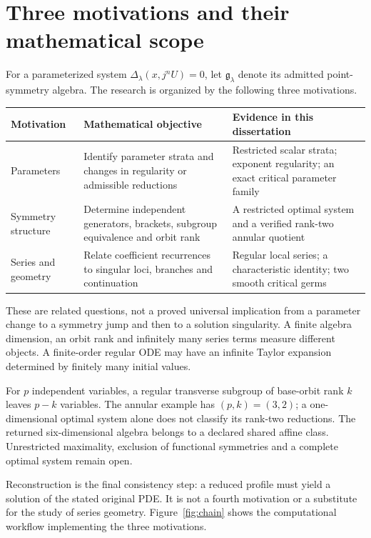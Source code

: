 \documentclass[12pt,a4paper,oneside]{report}
\numberwithin{equation}{chapter}
\theoremstyle{remark}\newtheorem{remark}[theorem]{Remark}
\begin{document}
\section{Three motivations and their mathematical scope}
For a parameterized system $\Delta_\lambda(x,j^nU)=0$, let
$\mathfrak g_\lambda$ denote its admitted point-symmetry algebra. The research
is organized by the following three motivations.
\begin{center}\small
\begin{tabularx}{\textwidth}{@{}p{}XX@{}}\toprule
Motivation & Mathematical objective & Evidence in this dissertation\\\midrule
Parameters & Identify parameter strata and changes in regularity or admissible reductions & Restricted scalar strata; exponent regularity; an exact critical parameter family\\
Symmetry structure & Determine independent generators, brackets, subgroup equivalence and orbit rank & A restricted optimal system and a verified rank-two annular quotient\\
Series and geometry & Relate coefficient recurrences to singular loci, branches and continuation & Regular local series; a characteristic identity; two smooth critical germs\\\bottomrule
\end{tabularx}
\end{center}
These are related questions, not a proved universal implication from a
parameter change to a symmetry jump and then to a solution singularity.
A finite algebra dimension, an orbit rank and infinitely many series terms
measure different objects. A finite-order regular ODE may have an infinite
Taylor expansion determined by finitely many initial values.

For $p$ independent variables, a regular transverse subgroup of base-orbit
rank $k$ leaves $p-k$ variables. The annular example has $(p,k)=(3,2)$;
a one-dimensional optimal system alone does not classify its rank-two
reductions. The returned six-dimensional algebra belongs to a declared
shared affine class. Unrestricted maximality, exclusion of functional
symmetries and a complete optimal system remain open.

Reconstruction is the final consistency step: a reduced profile must yield
a solution of the stated original PDE. It is not a fourth motivation or
a substitute for the study of series geometry. Figure~\ref{fig:chain}
shows the computational workflow implementing the three motivations.
\end{document}
